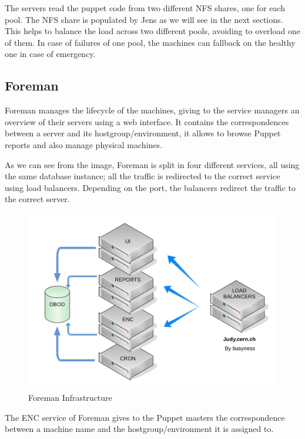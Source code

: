 The servers read the puppet code from two different NFS shares, one for
each pool. The NFS share is populated by Jens \cite{JensWebsite} as we
will see in the next sections. This helps to balance the load across two
different pools, avoiding to overload one of them. In case of failures of
one pool, the machines can fallback on the healthy one in case of
emergency. 

\subsection{Foreman}

Foreman manages the lifecycle of the machines, giving to the service
managers an overview of their servers using a web interface. It contains
the correspondences between a server and its hostgroup/environment, it
allows to browse Puppet reports and also manage physical machines.

As we can see from the image, Foreman is split in four different services,
all using the same database instance; all the traffic is redirected to the
correct service using load balancers. Depending on the port, the balancers
redirect the traffic to the correct server.

\begin{figure}[H]
\includegraphics[width=\textwidth,height=\textheight,keepaspectratio]{ConfigurationManagement/Infrastructure_judy.jpg}
\caption{Foreman Infrastructure}
\end{figure}

The ENC service of Foreman gives to the Puppet masters the correspondence
between a machine name and the hostgroup/environment it is assigned to.

